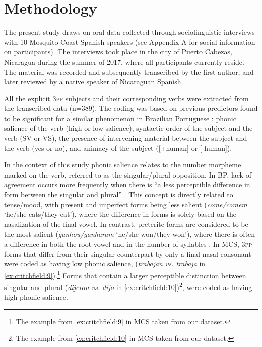\documentclass[output=paper,colorlinks,citecolor=brown,
]{langscibook}
\begin{document}
\section{Methodology}

The present study draws on oral data collected through sociolinguistic interviews with 10 Mosquito Coast Spanish speakers (see Appendix A for social information on participants). The interviews took place in the city of Puerto Cabezas, Nicaragua during the summer of 2017, where all participants currently reside. The material was recorded and subsequently transcribed by the first author, and later reviewed by a native speaker of  Nicaraguan Spanish. 

All the explicit \textsc{3pp} subjects and their corresponding verbs were extracted from the transcribed data (n=389). The coding was based on previous predictors found to be significant for a similar phenomenon in Brazilian Portuguese \citep{naro2000variable}: phonic salience of the verb (high or low salience), syntactic order of the subject and the verb (SV or VS), the presence of intervening material between the subject and the verb (yes or no), and animacy of the subject ([+human] or [-human]).

In the context of this study phonic salience relates to the number morpheme marked on the verb, referred to as the singular/plural opposition. In BP, lack of agreement occurs more frequently when there is ``a less perceptible difference in form between the singular and plural'' \citep[243]{naro2000variable}. This concept is directly related to tense/mood, with present and imperfect forms being less salient (\textit{come/comem} ‘he/she eats/they eat’), where the difference in forms is solely based on the nasalization of the final vowel. In contrast, preterite forms are considered to be the most salient (\textit{ganhou/ganharam} ‘he/she won/they won’), where there is often a difference in both the root vowel and in the number of syllables \citep[165]{scherre2010}. In MCS, \textsc{3pp} forms that differ from their singular counterpart by only a final nasal consonant were coded as having low phonic salience, (\textit{trabajan vs. trabaja} in \ref{ex:critchfield:9}).\footnote{The example from \ref{ex:critchfield:9} in MCS taken from our dataset.} Forms that contain a larger perceptible distinction between singular and plural (\textit{dijeron vs. dijo} in \ref{ex:critchfield:10})\footnote{The example from \ref{ex:critchfield:10} in MCS taken from our dataset.}, were coded as having high phonic salience.
\end{document}
